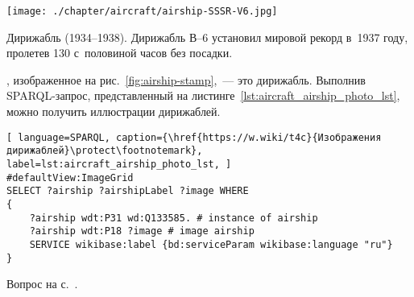 %
\begin{marginfigure}[3.2cm]
\centering\texttt{[image: ./chapter/aircraft/airship-SSSR-V6.jpg]}
\caption[Дирижабль СССР--В6 <<Осоавиахим>>.]{Дирижабль  (1934--1938). 
             Дирижабль В--6 установил мировой рекорд в~1937 году, 
             пролетев 130 с~половиной часов без посадки.\\
    }%
    \label{fig:airship-stamp}%
\end{marginfigure}
% 
\begin{task}
    \label{answer:aircraft_question_airship_2}
, изображенное на рис.~\ref{fig:airship-stamp},~--- это дирижабль. 
    Выполнив SPARQL-запрос, 
    представленный на листинге~\ref{lst:aircraft_airship_photo_lst}, 
    можно получить иллюстрации дирижаблей.
    
	\begin{lstlisting}[ language=SPARQL, caption={\href{https://w.wiki/t4c}{Изображения дирижаблей}\protect\footnotemark}, label=lst:aircraft_airship_photo_lst, ]
#defaultView:ImageGrid
SELECT ?airship ?airshipLabel ?image WHERE
{
    ?airship wdt:P31 wd:Q133585. # instance of airship
  	?airship wdt:P18 ?image # image airship
    SERVICE wikibase:label {bd:serviceParam wikibase:language "ru"}
}
\end{lstlisting}
    
\small{\AnswerBackref Вопрос на с.~\pageref{fig:airship_question_aircraft}.}
\end{task}






\hfil{}\hfil%

